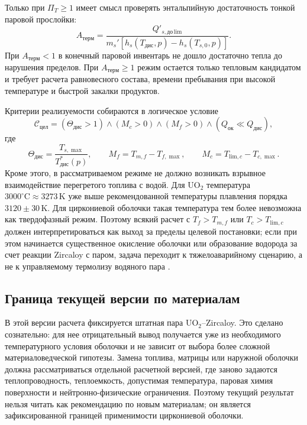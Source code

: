 \documentclass[12pt]{article}
\begin{document}
Только при \(\Pi_T\ge1\) имеет смысл проверять энтальпийную достаточность тонкой паровой прослойки:
\[
A_{\mathrm{терм}}=
\frac{Q'_{s,\mathrm{до\,lim}}}
{m_s'\left[h_s(T_{\mathrm{дис}},p)-h_s(T_{s,0},p)\right]}.
\]
При \(A_{\mathrm{терм}}<1\) в конечный паровой инвентарь не дошло достаточно тепла до нарушения пределов. При \(A_{\mathrm{терм}}\ge1\) режим остается только тепловым кандидатом и требует расчета равновесного состава, времени пребывания при высокой температуре и быстрой закалки продуктов.

Критерии реализуемости собираются в логическое условие
\[
\mathcal C_{\mathrm{цел}}=
(\Theta_{\mathrm{дис}}>1)
\land(M_c>0)
\land(M_f>0)
\land(Q_{\mathrm{ок}}\ll Q_{\mathrm{дис}}),
\]
где
\[
\Theta_{\mathrm{дис}}=\frac{T_{s,\max}}{T^*_{\mathrm{дис}}(p)},
\qquad
M_f=T_{m,f}-T_{f,\max},
\qquad
M_c=T_{\mathrm{lim},c}-T_{c,\max}.
\]
Кроме этого, в рассматриваемом режиме не должно возникать взрывное взаимодействие перегретого топлива с водой.
Для \(\mathrm{UO_2}\) температура \(3000^\circ\mathrm{C}\approx3273\,\mathrm{K}\) уже выше рекомендованной температуры плавления порядка \(3120\pm30\,\mathrm{K}\). Для циркониевой оболочки такая температура тем более невозможна как твердофазный режим. Поэтому всякий расчет с \(T_f>T_{m,f}\) или \(T_c>T_{\mathrm{lim},c}\) должен интерпретироваться как выход за пределы целевой постановки; если при этом начинается существенное окисление оболочки или образование водорода за счет реакции Zircaloy с паром, задача переходит к тяжелоаварийному сценарию, а не к управляемому термолизу водяного пара \cite{IAEATECDOC1496,IAEATECDOC1578,LOCAOxidation,OECDSerenaProject2014}.

\subsection{Граница текущей версии по материалам}

В этой версии расчета фиксируется штатная пара \(\mathrm{UO_2}\)--Zircaloy. Это сделано сознательно: для нее отрицательный вывод получается уже из необходимого температурного условия оболочки и не зависит от выбора более сложной материаловедческой гипотезы. Замена топлива, матрицы или наружной оболочки должна рассматриваться отдельной расчетной версией, где заново задаются теплопроводность, теплоемкость, допустимая температура, паровая химия поверхности и нейтронно-физические ограничения. Поэтому текущий результат нельзя читать как рекомендацию по новым материалам; он является зафиксированной границей применимости циркониевой оболочки.
\end{document}
